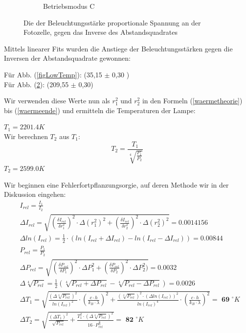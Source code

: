 \documentclass[12pt,a4paper,twopage]{article}
\begin{document}
\begin{figure}[H]
\begin{subfigure}{0.48\linewidth}
\caption{Betriebsmodus \label{figHighTemp} C}
\end{subfigure}
\caption{Die der Beleuchtungsstärke proportionale Spannung an der Fotozelle, gegen das Inverse des Abstandsquadrates}
\end{figure}

Mittels linearer Fits wurden die Anstiege der Beleuchtungsstärken gegen die Inversen der Abstandsquadrate gewonnen:\\
\vspace{5mm}
\begin{center}
Für Abb. (\ref{figLowTemp}): \hspace{1cm}  (35,15 $\pm$ 0,30 ) \\
Für Abb. (\ref{figHighTemp}): \hspace{1cm} (209,55 $\pm$ 0,30) \\
\end{center}
\vspace{5mm}
Wir verwenden diese Werte nun als $r_1^2$ und $r_2^2$ in den Formeln (\ref{waermetheorie}) bis (\ref{waermeende}) und ermitteln die Temperaturen der Lampe: \\
\begin{center}
$T_1=2201.4 K$ \\
Wir berechnen $T_2$ aus $T_1$: \\
\begin{equation}
T_2=\frac{T_1}{\sqrt[4]{\frac{P_1}{P_2}}} 
\end{equation}
$T_2=2599.0 K$ \\
\end{center}
Wir beginnen eine Fehlerfortpflanzungsorgie, auf deren Methode wir in der Diskussion eingehen:
\begin{align*}
&I_{rel}=\frac{I_1}{I_2}\\
&\Delta I_{rel}=\sqrt{ \left(\frac{\delta I_{rel}}{\delta r_1^2}\right)^2 \cdot \Delta (r_1^2)^2 + \left(\frac{\delta I_{rel}}{\delta r_2^2}\right)^2 \cdot \Delta (r_2^2)^2 } = 0.0014156 \\
&\Delta ln (I_{rel})= \frac{1}{2} \cdot ( ln(I_{rel}+ \Delta I_{rel}) - ln ( I_{rel} - \Delta I_{rel}) ) =  0.00844\\
&P_{rel}=\frac{P_1}{P_2} \\
&\Delta P_{rel} = \sqrt{ \left(\frac{\delta P_{rel}}{\delta P_1}\right)^2 \cdot \Delta P_1^2 + \left(\frac{\delta P_{rel}}{\delta P_2}\right)^2 \cdot \Delta P_2^2)} =  0.0032 \\
&\Delta \sqrt[4]{P_{rel}} = \frac{1}{2} \left(  \sqrt[4]{P_{rel}+ \Delta P_{rel}} -\sqrt[4]{P_{rel}-\Delta P_{rel}} \right) = 0.0026 \\
&\Delta T_1 = \sqrt{ \frac{ (\Delta \sqrt[4]{P_{rel}})^2}{ln(I_{rel})^2} \cdot \left( \frac{c \cdot h}{k_B\cdot \lambda} \right) ^2 + \frac{ (\sqrt[4]{P_{rel}})^2 \cdot (\Delta ln(I_{rel}))^2}{ln(I_{rel})^4} \cdot \left( \frac{c \cdot h}{k_B \cdot \lambda}  \right) ^2} = \textbf{ 69 } ^{\circ} K \\
&\Delta T_2 = \sqrt{ \frac{ ( \Delta T_1)^2}{\sqrt{P_{rel}}} + \frac{T_1^2 \cdot ( \Delta \sqrt[4]{P_{rel}})^2}{16 \cdot P_{rel}^{\frac{6}{4}} } } = \textbf{ 82 } ^{\circ} K
\end{align*}
\end{document}
